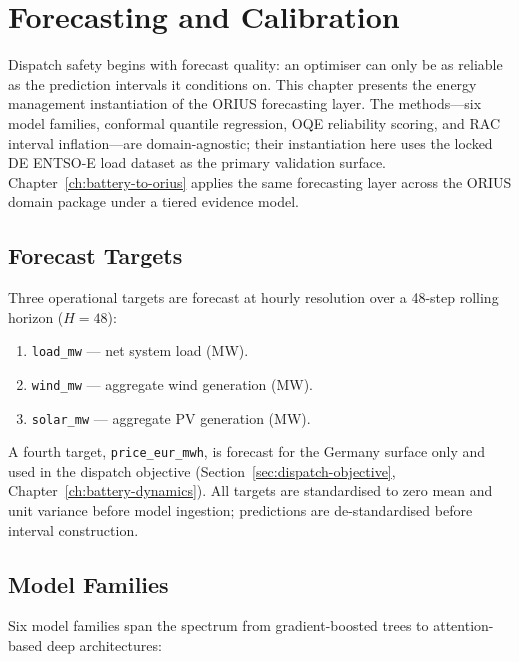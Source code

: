 
\chapter{Forecasting and Calibration}
\label{ch:forecasting}

Dispatch safety begins with forecast quality: an optimiser can only be as
reliable as the prediction intervals it conditions on.  This chapter
presents the energy management instantiation of the ORIUS forecasting
layer.  The methods---six model families, conformal quantile regression,
OQE reliability scoring, and RAC interval inflation---are domain-agnostic;
their instantiation here uses the locked DE ENTSO-E load dataset as the
primary validation surface.  Chapter~\ref{ch:battery-to-orius} applies
the same forecasting layer across the ORIUS domain package under a
tiered evidence model.

\section{Forecast Targets}

Three operational targets are forecast at hourly resolution over a
48-step rolling horizon ($H = 48$):

\begin{enumerate}
  \item \texttt{load\_mw} --- net system load (MW).
  \item \texttt{wind\_mw} --- aggregate wind generation (MW).
  \item \texttt{solar\_mw} --- aggregate PV generation (MW).
\end{enumerate}

A fourth target, \texttt{price\_eur\_mwh}, is forecast for the Germany
surface only and used in the dispatch objective
(Section~\ref{sec:dispatch-objective}, Chapter~\ref{ch:battery-dynamics}).
All targets are standardised to zero mean and unit variance before model
ingestion; predictions are de-standardised before interval construction.

\section{Model Families}
\label{sec:model-families}

Six model families span the spectrum from gradient-boosted trees to
attention-based deep architectures:

